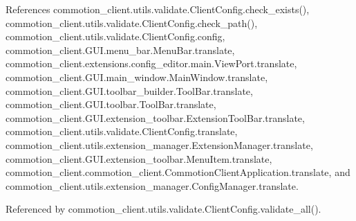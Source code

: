 References commotion\-\_\-client.\-utils.\-validate.\-Client\-Config.\-check\-\_\-exists(), commotion\-\_\-client.\-utils.\-validate.\-Client\-Config.\-check\-\_\-path(), commotion\-\_\-client.\-utils.\-validate.\-Client\-Config.\-config, commotion\-\_\-client.\-G\-U\-I.\-menu\-\_\-bar.\-Menu\-Bar.\-translate, commotion\-\_\-client.\-extensions.\-config\-\_\-editor.\-main.\-View\-Port.\-translate, commotion\-\_\-client.\-G\-U\-I.\-main\-\_\-window.\-Main\-Window.\-translate, commotion\-\_\-client.\-G\-U\-I.\-toolbar\-\_\-builder.\-Tool\-Bar.\-translate, commotion\-\_\-client.\-G\-U\-I.\-toolbar.\-Tool\-Bar.\-translate, commotion\-\_\-client.\-G\-U\-I.\-extension\-\_\-toolbar.\-Extension\-Tool\-Bar.\-translate, commotion\-\_\-client.\-utils.\-validate.\-Client\-Config.\-translate, commotion\-\_\-client.\-utils.\-extension\-\_\-manager.\-Extension\-Manager.\-translate, commotion\-\_\-client.\-G\-U\-I.\-extension\-\_\-toolbar.\-Menu\-Item.\-translate, commotion\-\_\-client.\-commotion\-\_\-client.\-Commotion\-Client\-Application.\-translate, and commotion\-\_\-client.\-utils.\-extension\-\_\-manager.\-Config\-Manager.\-translate.



Referenced by commotion\-\_\-client.\-utils.\-validate.\-Client\-Config.\-validate\-\_\-all().



